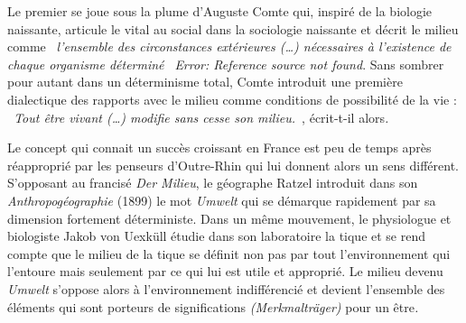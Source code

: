 {\sffamily\color{black}
Le premier se joue sous la plume d'Auguste Comte qui, inspir\'e de la biologie naissante, articule le vital au social
dans la sociologie naissante et d\'ecrit le milieu comme \textit{{\guillemotleft}~l'ensemble des circonstances
ext\'erieures ({\dots}) n\'ecessaires \`a l'existence de chaque organisme d\'etermin\'e~{\guillemotright}
}\textit{Error: Reference source not found}. Sans sombrer pour autant dans un d\'eterminisme total, Comte introduit une
premi\`ere dialectique des rapports avec le milieu comme conditions de possibilit\'e de la vie :
\textit{{\guillemotleft}~Tout \^etre vivant ({\dots}) modifie sans cesse son milieu.~{\guillemotright}}, \'ecrit-t-il
alors\textit{. }}

{\sffamily\color{black}
Le concept qui connait un succ\`es croissant en France est peu de temps apr\`es r\'eappropri\'e par les penseurs
d'Outre-Rhin qui lui donnent alors un sens diff\'erent. S'opposant au francis\'e \textit{Der Milieu}, le g\'eographe
Ratzel introduit dans son \textit{Anthropog\'eographie} (1899) le mot \textit{Umwelt} qui se d\'emarque rapidement par
sa dimension fortement d\'eterministe. Dans un m\^eme mouvement, le physiologue et biologiste Jakob von Uexk\"ull
\'etudie dans son laboratoire la tique et se rend compte que le milieu de la tique se d\'efinit non pas par tout
l'environnement qui l'entoure mais seulement par ce qui lui est utile et appropri\'e. Le milieu devenu \textit{Umwelt
}s'oppose alors \`a l'environnement indiff\'erenci\'e et devient l'ensemble des \'el\'ements qui sont porteurs de
significations \textit{(Merkmaltr\"ager)} pour un \^etre\textit{.} }

